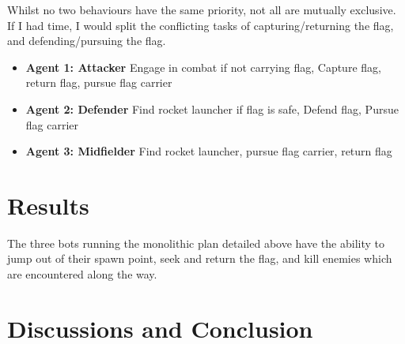 \documentclass[a4paper,12pt]{article}
\begin{document}

Whilst no two behaviours have the same priority, not all are mutually exclusive. If I had time, I would split the conflicting tasks of capturing/returning the flag, and defending/pursuing the flag.
\begin{itemize}
\item \textbf{Agent 1: Attacker} Engage in combat if not carrying flag, Capture flag, return flag, pursue flag carrier
\item \textbf{Agent 2: Defender} Find rocket launcher if flag is safe, Defend flag, Pursue flag carrier
\item \textbf{Agent 3: Midfielder} Find rocket launcher, pursue flag carrier, return flag
\end{itemize}

\section{Results}
The three bots running the monolithic plan detailed above have the ability to jump out of their spawn point, seek and return the flag, and kill enemies which are encountered along the way.

\section{Discussions and Conclusion}

\end{document}
